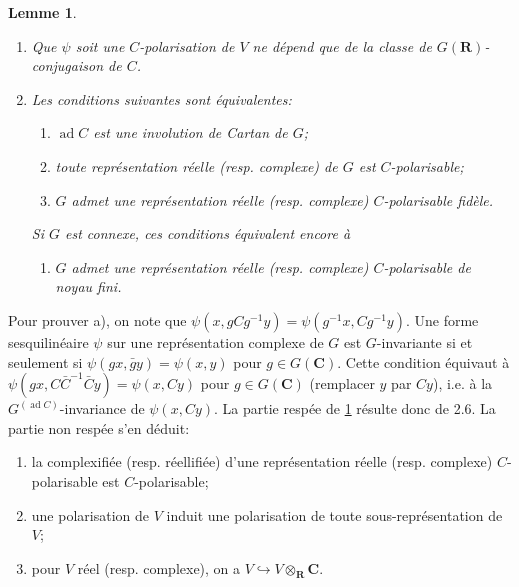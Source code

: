 \documentclass[11pt]{amsart}
\theoremstyle{plain}
\newtheorem{lemme}[theoreme]{Lemme}
\theoremstyle{definition}
\theoremstyle{remark}
\begin{document}
\begin{lemme}\label{lem:2.8}
\begin{enumerate}
\item[a)] Que $\psi$ soit une $C$-polarisation de $V$ ne d\'epend que de la classe de $G(\mathbf{R})$-conjugaison de $C$.
\item[b)] Les conditions suivantes sont \'equivalentes:
\begin{enumerate}
\item[(i)] $\operatorname{ad}C$ est une involution de Cartan de $G$;
\item[(ii)] toute repr\'esentation r\'eelle \textup{(}resp. complexe\textup{)} de $G$ est $C$-polarisable;
\item[(iii)] $G$ admet une repr\'esentation r\'eelle \textup{(}resp. complexe\textup{)} $C$-polarisable fid\`ele.
\end{enumerate}
Si $G$ est connexe, ces conditions \'equivalent encore \`a
\begin{enumerate}
\item[(iii$'$)] $G$ admet une repr\'esentation r\'eelle \textup{(}resp. complexe\textup{)} $C$-polarisable de noyau fini.
\end{enumerate}
\end{enumerate}
\end{lemme}

Pour prouver a), on note que $\psi(x,gCg^{-1}y)=\psi(g^{-1}x,Cg^{-1}y)$. Une forme sesquilin\'eaire $\psi$ sur une repr\'esentation complexe de $G$ est $G$-invariante si et seulement si $\psi(gx,\bar{g}y)=\psi(x,y)$ pour $g\in G(\mathbf{C})$. Cette condition \'equivaut \`a $\psi(gx,C\bar{C}^{-1}\bar{C}y)=\psi(x,Cy)$ pour $g\in G(\mathbf{C})$ (remplacer $y$ par $Cy$), i.e. \`a la $G^{(\operatorname{ad}C)}$-invariance de $\psi(x,Cy)$. La partie resp\'ee de \ref{lem:2.8} r\'esulte donc de 2.6. La partie non resp\'ee s'en d\'eduit:
\begin{enumerate}
\item[a)] la complexifi\'ee (resp. r\'eellifi\'ee) d'une repr\'esentation r\'eelle (resp. complexe) $C$-polarisable est $C$-polarisable;
\item[b)] une polarisation de $V$ induit une polarisation de toute sous-repr\'esentation de $V$;
\item[c)] pour $V$ r\'eel (resp. complexe), on a $V\hookrightarrow V\otimes_\mathbf{R}\mathbf{C}$.
\end{enumerate}
\end{document}
